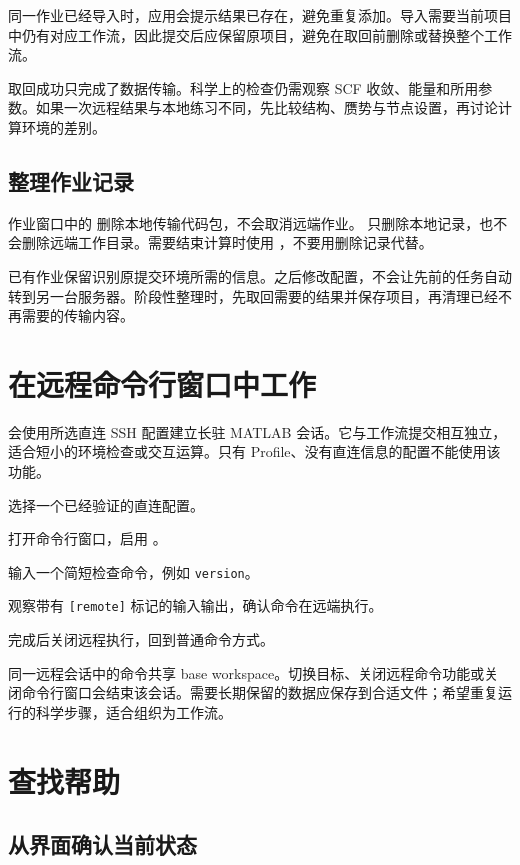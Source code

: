 同一作业已经导入时，应用会提示结果已存在，避免重复添加。导入需要当前项目中仍有对应工作流，因此提交后应保留原项目，避免在取回前删除或替换整个工作流。

取回成功只完成了数据传输。科学上的检查仍需观察 SCF 收敛、能量和所用参数。如果一次远程结果与本地练习不同，先比较结构、赝势与节点设置，再讨论计算环境的差别。

\subsection{整理作业记录}

作业窗口中的  删除本地传输代码包，不会取消远端作业。 只删除本地记录，也不会删除远端工作目录。需要结束计算时使用 ，不要用删除记录代替。

已有作业保留识别原提交环境所需的信息。之后修改配置，不会让先前的任务自动转到另一台服务器。阶段性整理时，先取回需要的结果并保存项目，再清理已经不再需要的传输内容。

\section{在远程命令行窗口中工作}

 会使用所选直连 SSH 配置建立长驻 MATLAB\regmark{} 会话。它与工作流提交相互独立，适合短小的环境检查或交互运算。只有 Profile、没有直连信息的配置不能使用该功能。

\begin{steps}
\item 选择一个已经验证的直连配置。
\item 打开命令行窗口，启用 。
\item 输入一个简短检查命令，例如 \texttt{version}。
\item 观察带有 \texttt{[remote]} 标记的输入输出，确认命令在远端执行。
\item 完成后关闭远程执行，回到普通命令方式。
\end{steps}

同一远程会话中的命令共享 base workspace。切换目标、关闭远程命令功能或关闭命令行窗口会结束该会话。需要长期保留的数据应保存到合适文件；希望重复运行的科学步骤，适合组织为工作流。

\section{查找帮助}

\subsection{从界面确认当前状态}

